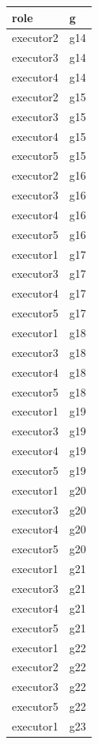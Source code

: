 \documentclass[12pt]{article}
\begin{document}
\begin{table}[H]
\centering
{}
\begin{tabular}{|l|l|}
\hline
\textbf{role} & \textbf{g} \\ \hline
executor2 & g14 \\ \hline
executor3 & g14 \\ \hline
executor4 & g14 \\ \hline
executor2 & g15 \\ \hline
executor3 & g15 \\ \hline
executor4 & g15 \\ \hline
executor5 & g15 \\ \hline
executor2 & g16 \\ \hline
executor3 & g16 \\ \hline
executor4 & g16 \\ \hline
executor5 & g16 \\ \hline
executor1 & g17 \\ \hline
executor3 & g17 \\ \hline
executor4 & g17 \\ \hline
executor5 & g17 \\ \hline
executor1 & g18 \\ \hline
executor3 & g18 \\ \hline
executor4 & g18 \\ \hline
executor5 & g18 \\ \hline
executor1 & g19 \\ \hline
executor3 & g19 \\ \hline
executor4 & g19 \\ \hline
executor5 & g19 \\ \hline
executor1 & g20 \\ \hline
executor3 & g20 \\ \hline
executor4 & g20 \\ \hline
executor5 & g20 \\ \hline
executor1 & g21 \\ \hline
executor3 & g21 \\ \hline
executor4 & g21 \\ \hline
executor5 & g21 \\ \hline
executor1 & g22 \\ \hline
executor2 & g22 \\ \hline
executor3 & g22 \\ \hline
executor5 & g22 \\ \hline
executor1 & g23 \\ \hline

\end{tabular}
\end{table}
\end{document}
